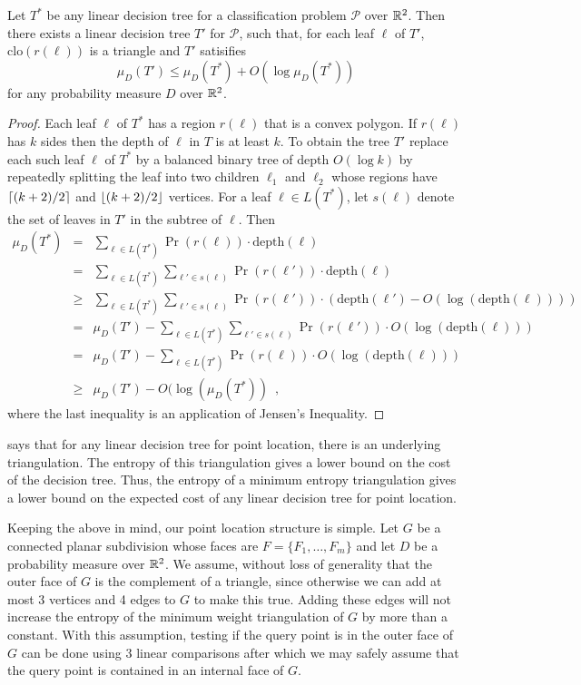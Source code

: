 \documentclass[acmtalg]{acmsmall}
\newcommand{\closure}{\mathrm{clo}}
\newcommand{\depth}{\mathrm{depth}}
\begin{document}
\begin{lem}
Let $T^*$ be any linear decision tree for a classification problem
$\mathcal{P}$ over $\mathbb{R}^2$.  Then there exists a linear decision tree
$T'$ for $\mathcal{P}$, such that, for each leaf $\ell$ of $T'$,
$\closure(r(\ell))$ is a triangle and $T'$ satisifies
\[
    \mu_D(T') \le \mu_D(T^*) + O(\log\mu_D(T^*))
\]
for any probability measure $D$ over $\mathbb{R}^2$.
\end{lem}

\begin{proof}
Each leaf $\ell$ of $T^*$ has a region $r(\ell)$ that is a convex
polygon.  If $r(\ell)$ has $k$ sides then the depth of $\ell$ in $T$
is at least $k$.  To obtain the tree $T'$ replace each such leaf
$\ell$ of $T^*$ by a balanced binary tree of depth $O(\log k)$ by
repeatedly splitting the leaf into two children $\ell_1$ and $\ell_2$
whose regions have ${\left\lceil (k+2)/2 \right\rceil}$ and ${\left\lfloor (k+2)/2 \right\rfloor}$ vertices.
For a leaf $\ell\in L(T^*)$, let $s(\ell)$ denote the set of leaves in $T'$
in the subtree of $\ell$.   Then
\begin{eqnarray*}
   \mu_D(T^*) 
     &  =  & \sum_{\ell\in L(T^*)} \Pr(r(\ell))\cdot \depth(\ell) \\
     &  =  & \sum_{\ell\in L(T^*)}\sum_{\ell'\in s(\ell)} 
              \Pr(r(\ell'))\cdot \depth(\ell) \\
     & \ge & \sum_{\ell\in L(T^*)} 
             \sum_{\ell'\in s(\ell)}\Pr(r(\ell'))\cdot (\depth(\ell')
                   - O(\log (\depth(\ell)))) \\
     &  =  & \mu_D(T') - \sum_{\ell\in L(T^*)} 
             \sum_{\ell'\in s(\ell)}\Pr(r(\ell'))\cdot O(\log (\depth(\ell))) \\
     &  =  & \mu_D(T') - \sum_{\ell\in L(T^*)} 
             \Pr(r(\ell))\cdot O(\log (\depth(\ell))) \\
     & \ge & \mu_D(T') - O(\log(\mu_D(T^*)) \enspace , 
\end{eqnarray*}
where the last inequality is an application of Jensen's Inequality.
\end{proof}

 says that for any linear decision tree for point
location, there is an underlying triangulation.  The entropy of this
triangulation gives a lower bound on the cost of the decision tree.
Thus, the entropy of a minimum entropy triangulation gives a lower
bound on the expected cost of any linear decision tree for point
location.

Keeping the above in mind, our point location structure is simple.
Let $G$ be a connected planar subdivision whose faces are
$F=\{F_1,\ldots,F_m\}$ and let $D$ be a probability measure over
$\mathbb{R}^2$.  We assume, without loss of generality that the outer face of
$G$ is the complement of a triangle, since otherwise we can add at
most 3 vertices and 4 edges to $G$ to make this true.  Adding these
edges will not increase the entropy of the minimum weight triangulation
of $G$ by more than a constant.  With this assumption, testing if the
query point is in the outer face of $G$ can be done using 3 linear
comparisons after which we may safely assume that the query point is
contained in an internal face of $G$.
\end{document}
